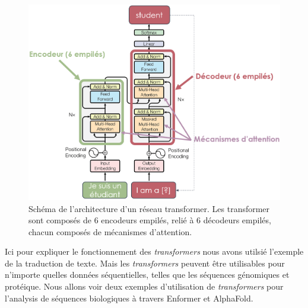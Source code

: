 \begin{figure}[!htbp]
 \centering
 \includegraphics[width=1\textwidth]{figures/transformer.png}
 \caption[Schéma de l'architecture d'un réseau Transformer]{Schéma de l'architecture d'un réseau transformer. Les transformer sont composés de 6 encodeurs empilés, relié à 6 décodeurs empilés, chacun composés de mécanismes d'attention.}
 \label{fig:transformer}
\end{figure}
Ici pour expliquer le fonctionnement des \textit{transformers} nous avons utilsié l'exemple de la traduction de texte. Mais les \textit{transformers} peuvent être utilisables pour n'importe quelles données séquentielles, telles que les séquences génomiques et protéique. Nous allons voir deux exemples d'utilisation de \textit{transformers} pour l'analysis de séquences biologiques à travers Enformer et AlphaFold.

